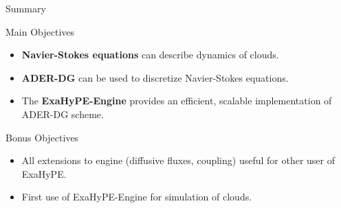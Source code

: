 \documentclass{beamer}
\begin{document}
\begin{frame}{Summary}
  \begin{block}{Main Objectives}
  \begin{itemize}
  \item \textbf{Navier-Stokes equations} can describe dynamics of clouds.
  \item \textbf{ADER-DG} can be used to discretize Navier-Stokes equations.
  \item The \textbf{ExaHyPE-Engine} provides an efficient, scalable implementation of ADER-DG scheme. 
  \end{itemize}
  \end{block}

  \begin{block}{Bonus Objectives}
    \begin{itemize}
    \item All extensions to engine (diffusive fluxes, coupling) useful for other user of ExaHyPE.
    \item First use of ExaHyPE-Engine for simulation of clouds.
    \end{itemize}

  \end{block}
\end{frame}
\end{document}
